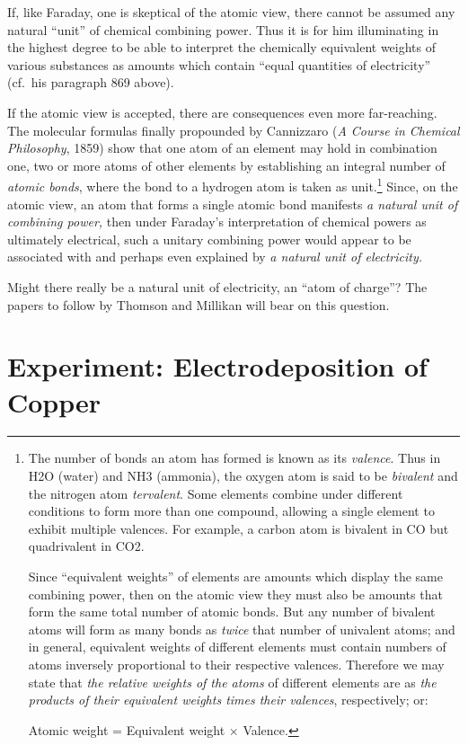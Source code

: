If, like Faraday, one is skeptical of the atomic view, there cannot be
assumed any natural ``unit'' of chemical combining power. Thus it is for
him illuminating in the highest degree to be able to interpret the
chemically equivalent weights of various substances as amounts which
contain ``equal quantities of electricity'' (cf.\ his paragraph 869
above).

If the atomic view is accepted, there are consequences even more
far-reaching. The molecular formulas finally propounded by Cannizzaro
(\emph{A Course in Chemical Philosophy}, 1859) show that one atom of an
element may hold in combination one, two or more atoms of other elements
by establishing an integral number of \emph{atomic bonds}, where the
bond to a hydrogen atom is taken as unit.\footnote{The number of bonds
  an atom has formed is known as its \emph{valence}. Thus in H2O (water)
  and NH3 (ammonia), the oxygen atom is said to be \emph{bivalent} and
  the nitrogen atom \emph{tervalent}. Some elements combine under
  different conditions to form more than one compound, allowing a single
  element to exhibit multiple valences. For example, a carbon atom is
  bivalent in CO but quadrivalent in CO2.

  Since ``equivalent weights'' of elements are amounts which display the
  same combining power, then on the atomic view they must also be
  amounts that form the same total number of atomic bonds. But any
  number of bivalent atoms will form as many bonds as \emph{twice} that
  number of univalent atoms; and in general, equivalent weights of
  different elements must contain numbers of atoms inversely
  proportional to their respective valences. Therefore we may state that
  \emph{the relative weights of the atoms} of different elements are as
  \emph{the products of their equivalent weights times their valences},
  respectively; or:

  Atomic weight = Equivalent weight $\times$ Valence.} Since, on the atomic
view, an atom that forms a single atomic bond manifests \emph{a natural
unit of combining power,} then under Faraday's interpretation of chemical
powers as ultimately electrical, such a unitary combining power would
appear to be associated with and perhaps even explained by \emph{a
natural unit of electricity.}

Might there really be a natural unit of electricity, an ``atom of
charge''? The papers to follow by Thomson and Millikan will bear on this
question.

\section*{Experiment: Electrodeposition of Copper}

